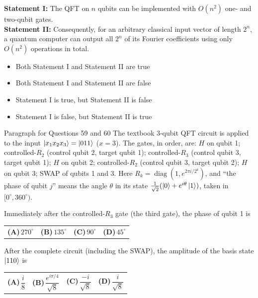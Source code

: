 \documentclass[11pt,a4paper]{article}
\newcommand{\optlabel}[1]{\textbf{(#1)}}
\newenvironment{qitem}[1]{\begin{list}{}{\setlength{\leftmargin}{3.3em}\setlength{\labelwidth}{3.1em}%
  \setlength{\labelsep}{0.2em}\setlength{\topsep}{3pt}\setlength{\parsep}{3pt}}\item[\textbf{Q.#1}\hfill]}{\end{list}}
\newcommand{\qsep}{\par\vspace{2pt}{\color{black!15}\hrule}\vspace{4pt}}
\begin{document}
\begin{qitem}{58}
\textbf{Statement I:} The QFT on $n$ qubits can be implemented with $O(n^2)$ one- and two-qubit gates.\\[1mm]
\textbf{Statement II:} Consequently, for an arbitrary classical input vector of length $2^n$, a quantum computer can output all
$2^n$ of its Fourier coefficients using only $O(n^2)$ operations in total.
\begin{itemize}[leftmargin=2.6em, labelsep=0.4em, itemsep=2pt, topsep=3pt]
\item[\optlabel{A}] Both Statement I and Statement II are true
\item[\optlabel{B}] Both Statement I and Statement II are false
\item[\optlabel{C}] Statement I is true, but Statement II is false
\item[\optlabel{D}] Statement I is false, but Statement II is true
\end{itemize}
\end{qitem}
\qsep

\begin{passagebox}{Paragraph for Questions 59 and 60}
The textbook 3-qubit QFT circuit is applied to the input $\ket{x_1x_2x_3} = \ket{011}$ ($x = 3$). The gates, in order, are:
$H$ on qubit 1; controlled-$R_2$ (control qubit 2, target qubit 1); controlled-$R_3$ (control qubit 3, target qubit 1);
$H$ on qubit 2; controlled-$R_2$ (control qubit 3, target qubit 2); $H$ on qubit 3; SWAP of qubits 1 and 3.
Here $R_k = \operatorname{diag}(1, e^{2\pi i/2^k})$, and ``the phase of qubit $j$'' means the angle $\theta$ in its state
$\frac{1}{\sqrt2}(\ket0 + e^{i\theta}\ket1)$, taken in $[0^\circ, 360^\circ)$.
\end{passagebox}
\begin{qitem}{59}
Immediately after the controlled-$R_3$ gate (the third gate), the phase of qubit 1 is
\par\smallskip\noindent\begin{tabularx}{\linewidth}{@{}*{4}{L}@{}}
\optlabel{A}\,$270^\circ$ & \optlabel{B}\,$135^\circ$ & \optlabel{C}\,$90^\circ$ & \optlabel{D}\,$45^\circ$
\end{tabularx}
\end{qitem}
\qsep

\begin{qitem}{60}
After the complete circuit (including the SWAP), the amplitude of the basis state $\ket{110}$ is
\par\smallskip\noindent\begin{tabularx}{\linewidth}{@{}*{4}{L}@{}}
\optlabel{A}\,$\dfrac{i}{8}$ & \optlabel{B}\,$\dfrac{e^{i\pi/4}}{\sqrt8}$ & \optlabel{C}\,$\dfrac{-i}{\sqrt8}$ & \optlabel{D}\,$\dfrac{i}{\sqrt8}$
\end{tabularx}
\end{qitem}
\qsep
\end{document}
